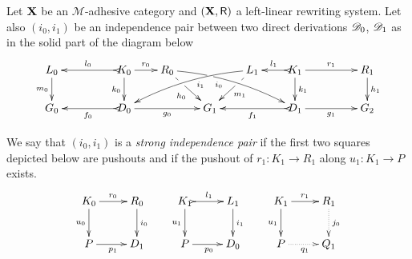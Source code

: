 \begin{definition}
	\label{def:strong}
	Let $\textbf {\textup{X}}$ be an $\mathcal{M}$-adhesive category 
	and $(\textbf {\textup{X}}, \mathsf{R})$ a left-linear rewriting system. 
	Let also $(i_0, i_1)$ be an independence pair between two direct
	derivations $\mathscr{D}_0$, $\mathscr{D}_1$
	as in the solid part of the diagram below
	\[\xymatrix@R=20pt@C=20pt{L_0 \ar[d]_{m_0}&& K_0
	\ar[d]_{k_0}\ar@{>->}[ll]_{l_0} \ar[r]^{r_0} & R_0
	\ar@/^.25cm/[drrr]|(.32)\hole_(.4){i_0}
	\ar[dr]|(.33)\hole_{h_0} && L_1 \ar@/_.25cm/[dlll]^(.4){i_1}
	\ar[dl]|(.33)\hole^{m_1}& K_1 \ar[d]^{k_1}\ar@{>->}[l]_{l_1}
	\ar[rr]^{r_1} && R_1 \ar[d]^{h_1}\\G_0 && \ar@{>->}[ll]^{f_0}
	D_0 \ar[rr]_{g_0}&& G_1 && \ar@{>->}[ll]^{f_1} D_1
	\ar[rr]_{g_1}&& G_2}
\]
	
	We say that $(i_0, i_1)$ is a \emph{strong independence pair} if
	the first two squares depicted  
	below are pushouts and if the pushout of $r_1 : K_1 \to R_1$ along $u_1 : K_1 \to P$ exists.
	\[
	\xymatrix{
		K_0 \ar[r]^{r_0} \ar[d]_{u_0}& R_0 \ar[d]^{i_0} & K_1
		\ar@{>->}[r]^{l_1} \ar[d]_{u_1}& L_1 \ar[d]^{i_1}
		&K_1 \ar[r]^{r_1} \ar[d]_{u_1}& R_1\ar@{.>}[d]^{j_0}
		\\
		P \ar[r]_{p_1} & D_1 &P \ar[r]_{p_0} & D_0
		& P \ar@{.>}[r]_{q_1} & Q_1
	}
	\]
\end{definition}

